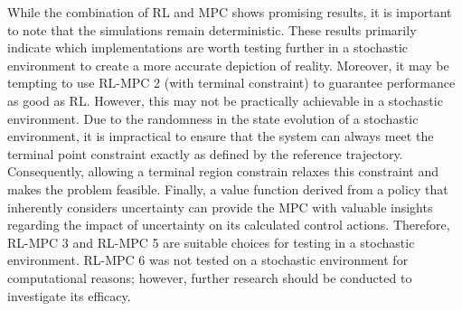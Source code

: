 While the combination of RL and MPC shows promising results, it is important to note that the simulations remain deterministic. These results primarily indicate which implementations are worth testing further in a stochastic environment to create a more accurate depiction of reality. Moreover, it may be tempting to use RL-MPC 2 (with terminal constraint) to guarantee performance as good as RL. However, this may not be practically achievable in a stochastic environment. Due to the randomness in the state evolution of a stochastic environment, it is impractical to ensure that the system can always meet the terminal point constraint exactly as defined by the reference trajectory. Consequently, allowing a terminal region constrain relaxes this constraint and makes the problem feasible. Finally, a value function derived from a policy that inherently considers uncertainty can provide the MPC with valuable insights regarding the impact of uncertainty on its calculated control actions. Therefore, RL-MPC 3 and RL-MPC 5 are suitable choices for testing in a stochastic environment. RL-MPC 6 was not tested on a stochastic environment for computational reasons; however, further research should be conducted to investigate its efficacy.

